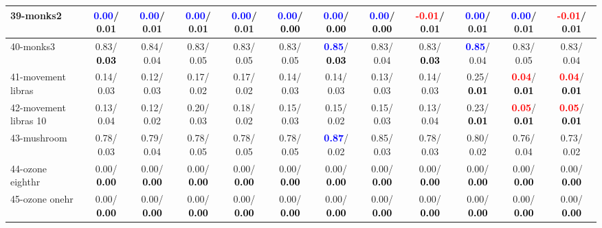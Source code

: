 \begin{table}[h]
\begin{center}
{\begin{tabular}{lc|c|c|c|c|c|c|c|c|c|c}
39-monks2 & \textcolor{blue}{\textbf{  0.00}}/  0.01 & \textcolor{blue}{\textbf{  0.00}}/  0.01 & \textcolor{blue}{\textbf{  0.00}}/  0.01 & \textcolor{blue}{\textbf{  0.00}}/  0.01 & \textcolor{blue}{\textbf{  0.00}}/\textcolor{black}{\textbf{  0.00}} & \textcolor{blue}{\textbf{  0.00}}/\textcolor{black}{\textbf{  0.00}} & \textcolor{blue}{\textbf{  0.00}}/\textcolor{black}{\textbf{  0.00}} & \textcolor{red}{\textbf{ -0.01}}/  0.01 & \textcolor{blue}{\textbf{  0.00}}/  0.01 & \textcolor{blue}{\textbf{  0.00}}/  0.01 & \textcolor{red}{\textbf{ -0.01}}/  0.01 \\ \hline
40-monks3 &   0.83/\textcolor{black}{\textbf{  0.03}} &   0.84/  0.04 &   0.83/  0.05 &   0.83/  0.05 &   0.83/  0.05 & \textcolor{blue}{\textbf{  0.85}}/\textcolor{black}{\textbf{  0.03}} &   0.83/  0.04 &   0.83/\textcolor{black}{\textbf{  0.03}} & \textcolor{blue}{\textbf{  0.85}}/  0.04 &   0.83/  0.05 &   0.83/  0.04 \\
41-movement libras &   0.14/  0.03 &   0.12/  0.03 &   0.17/  0.02 &   0.17/  0.02 &   0.14/  0.03 &   0.14/  0.03 &   0.13/  0.03 &   0.14/  0.03 &   0.25/\textcolor{black}{\textbf{  0.01}} & \textcolor{red}{\textbf{  0.04}}/\textcolor{black}{\textbf{  0.01}} & \textcolor{red}{\textbf{  0.04}}/\textcolor{black}{\textbf{  0.01}} \\
42-movement libras 10 &   0.13/  0.04 &   0.12/  0.02 &   0.20/  0.03 &   0.18/  0.02 &   0.15/  0.03 &   0.15/  0.02 &   0.15/  0.03 &   0.13/  0.04 &   0.23/\textcolor{black}{\textbf{  0.01}} & \textcolor{red}{\textbf{  0.05}}/\textcolor{black}{\textbf{  0.01}} & \textcolor{red}{\textbf{  0.05}}/\textcolor{black}{\textbf{  0.01}} \\
43-mushroom &   0.78/  0.03 &   0.79/  0.04 &   0.78/  0.05 &   0.78/  0.05 &   0.78/  0.05 & \textcolor{blue}{\textbf{  0.87}}/  0.02 &   0.85/  0.03 &   0.78/  0.03 &   0.80/  0.02 &   0.76/  0.04 &   0.73/  0.02 \\
44-ozone eighthr &   0.00/\textcolor{black}{\textbf{  0.00}} &   0.00/\textcolor{black}{\textbf{  0.00}} &   0.00/\textcolor{black}{\textbf{  0.00}} &   0.00/\textcolor{black}{\textbf{  0.00}} &   0.00/\textcolor{black}{\textbf{  0.00}} &   0.00/\textcolor{black}{\textbf{  0.00}} &   0.00/\textcolor{black}{\textbf{  0.00}} &   0.00/\textcolor{black}{\textbf{  0.00}} &   0.00/\textcolor{black}{\textbf{  0.00}} &   0.00/\textcolor{black}{\textbf{  0.00}} &   0.00/\textcolor{black}{\textbf{  0.00}} \\
45-ozone onehr &   0.00/\textcolor{black}{\textbf{  0.00}} &   0.00/\textcolor{black}{\textbf{  0.00}} &   0.00/\textcolor{black}{\textbf{  0.00}} &   0.00/\textcolor{black}{\textbf{  0.00}} &   0.00/\textcolor{black}{\textbf{  0.00}} &   0.00/\textcolor{black}{\textbf{  0.00}} &   0.00/\textcolor{black}{\textbf{  0.00}} &   0.00/\textcolor{black}{\textbf{  0.00}} &   0.00/\textcolor{black}{\textbf{  0.00}} &   0.00/\textcolor{black}{\textbf{  0.00}} &   0.00/\textcolor{black}{\textbf{  0.00}} \\

\end{tabular}}
\end{center}
\end{table}

